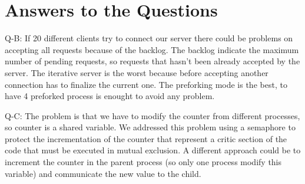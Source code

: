 





\maketitle

%
%
%
%
%



\section{Answers to the Questions}


\clearpage


Q-B: If 20 different clients try to connect our server there could be problems on accepting all requests because of the backlog. The backlog indicate the maximum number of pending requests, so requests that hasn't been already accepted by the server. The iterative server is the worst because before accepting another connection has to finalize the current one. The preforking mode is the best, to have 4 preforked process is enought to avoid any problem.

Q-C: The problem is that we have to modify the counter from different processes, so counter is a shared variable. We addressed this problem using a semaphore to protect the incrementation of the counter that represent a critic section of the code that must be executed in mutual exclusion. A different approach could be to increment the counter in the parent process (so only one process modify this variable) and communicate the new value to the child.

